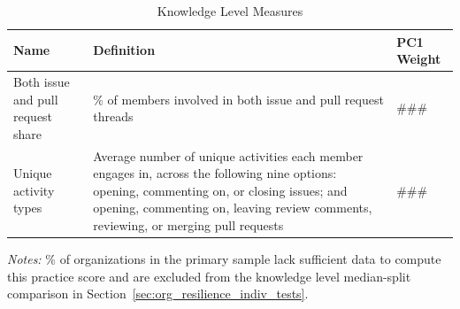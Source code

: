 \begin{longtable}{>{\raggedright\arraybackslash}p{} p{}p{}}
\caption{Knowledge Level Measures}\label{tab:knowledge_level_metrics}\\
\toprule
\textbf{Name} & \textbf{Definition} &\textbf{PC1 Weight} \\
\midrule
\endfirsthead

\bottomrule
\endlastfoot


Both issue and pull request share & \% of members involved in both issue and pull request threads & ### \\
Unique activity types & Average number of unique activities each member engages in, across the following nine options: opening, commenting on, or closing issues; and opening, commenting on, leaving review comments, reviewing, or merging pull requests & ### \\
\end{longtable}

\vspace{-0.5em} %
\begin{minipage}{\textwidth}
\footnotesize
\setlength{\parskip}{0pt}
\setlength{\baselineskip}{0.9\baselineskip}
\textit{Notes:} \KnowledgePCExcludedPct\% of organizations in the primary sample lack sufficient data to compute this practice score and are excluded from the knowledge level median-split comparison in Section~\ref{sec:org_resilience_indiv_tests}.
\end{minipage}

